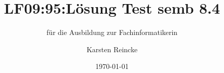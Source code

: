 \documentclass[]{beamer}
\title{LF09:95:Lösung Test semb 8.4}
\subtitle{für die Ausbildung zur Fachinformatikerin}
\institute[GS-LDK]{Gewerbliche Schulen Dillenburg}
\author{Karsten Reincke}
\date{\today}
\def\cfgGl{../../../cfg.gl/}
\begin{document}

\begin{frame}
  \titlepage

  
\end{frame}






\logo{}
\newpage




\end{document}
